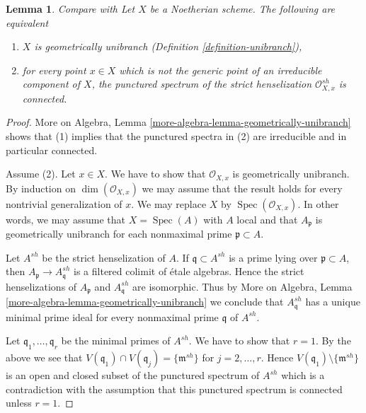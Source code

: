 \documentclass{stacks-project}
\newenvironment{reference}{\comment}{\endcomment}
\theoremstyle{plain}
\newtheorem{lemma}[subsection]{Lemma}
\theoremstyle{definition}
\theoremstyle{remark}
\numberwithin{equation}{subsection}
\def\Spec{\mathop{\mathrm{Spec}}}
\begin{document}
\begin{lemma}
\label{lemma-geometrically-unibranch}
\begin{reference}
Compare with \cite[Proposition 2.3]{Etale-coverings}
\end{reference}
Let $X$ be a Noetherian scheme. The following are equivalent
\begin{enumerate}
\item $X$ is geometrically unibranch (Definition \ref{definition-unibranch}),
\item for every point $x \in X$ which is not the generic point of
an irreducible component of $X$, the punctured spectrum of the
strict henselization $\mathcal{O}_{X, x}^{sh}$ is connected.
\end{enumerate}
\end{lemma}

\begin{proof}
More on Algebra, Lemma \ref{more-algebra-lemma-geometrically-unibranch}
shows that (1) implies that the punctured spectra in (2) are
irreducible and in particular connected.

\medskip\noindent
Assume (2). Let $x \in X$. We have to show that $\mathcal{O}_{X, x}$
is geometrically unibranch. By induction on $\dim(\mathcal{O}_{X, x})$
we may assume that the result holds for every nontrivial generalization of $x$.
We may replace $X$ by $\Spec(\mathcal{O}_{X, x})$. In other words,
we may assume that $X = \Spec(A)$ with $A$ local and that
$A_\mathfrak p$ is geometrically unibranch for each nonmaximal
prime $\mathfrak p \subset A$.

\medskip\noindent
Let $A^{sh}$ be the strict henselization of $A$. If
$\mathfrak q \subset A^{sh}$ is a prime lying over $\mathfrak p \subset A$,
then $A_\mathfrak p \to A^{sh}_\mathfrak q$ is a
filtered colimit of \'etale algebras. Hence the strict henselizations of
$A_\mathfrak p$ and $A^{sh}_\mathfrak q$ are isomorphic.
Thus by More on Algebra, Lemma \ref{more-algebra-lemma-geometrically-unibranch}
we conclude that $A^{sh}_\mathfrak q$
has a unique minimal prime ideal for every nonmaximal prime $\mathfrak q$ of
$A^{sh}$.

\medskip\noindent
Let $\mathfrak q_1, \ldots, \mathfrak q_r$ be the minimal primes
of $A^{sh}$. We have to show that $r = 1$. By the above
we see that $V(\mathfrak q_1) \cap V(\mathfrak q_j) = \{\mathfrak m^{sh}\}$
for $j = 2, \ldots, r$. Hence $V(\mathfrak q_1) \setminus \{\mathfrak m^{sh}\}$
is an open and closed subset of the punctured spectrum of $A^{sh}$
which is a contradiction with the assumption that this punctured spectrum
is connected unless $r = 1$.
\end{proof}
\end{document}
